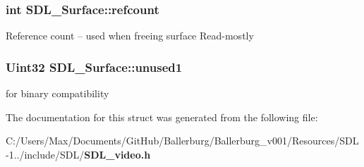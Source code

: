 \subsubsection[{refcount}]{\setlength{\rightskip}{0pt plus 5cm}int S\+D\+L\+\_\+\+Surface\+::refcount}\label{struct_s_d_l___surface_a03d10628a359c0674f5ceffd574f1641}
Reference count -- used when freeing surface Read-\/mostly 
\subsubsection[{unused1}]{\setlength{\rightskip}{0pt plus 5cm}Uint32 S\+D\+L\+\_\+\+Surface\+::unused1}\label{struct_s_d_l___surface_a41066cf7cc91d2f032dd0f29cc418ec4}
for binary compatibility 

The documentation for this struct was generated from the following file\+:\begin{DoxyCompactItemize}
\item 
C\+:/\+Users/\+Max/\+Documents/\+Git\+Hub/\+Ballerburg/\+Ballerburg\+\_\+v001/\+Resources/\+S\+D\+L-\/1../include/\+S\+D\+L/{\bf S\+D\+L\+\_\+video.\+h}\end{DoxyCompactItemize}

